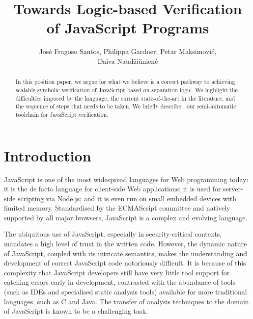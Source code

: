 \documentclass{llncs}
\newcounter{main}
\begin{document}
\title{Towards Logic-based Verification \\of JavaScript Programs}

\author{Jos\'{e} Fragoso Santos, Philippa Gardner, Petar Maksimovi\'{c}, \\[1mm]Daiva Naud\v{z}i\={u}nien\.{e}}


\maketitle

\begin{abstract}

In this position paper, we argue for what we believe is a correct pathway to achieving scalable symbolic verification of JavaScript based on separation logic. We highlight the difficulties imposed by the language, the current state-of-the-art in the literature, and the  sequence of steps that needs to be taken. We briefly describe \javert, our semi-automatic toolchain for JavaScript verification.

\end{abstract}

\section{Introduction}\label{intro}
JavaScript is one of the most widespread languages for Web programming
today:
 it is the de facto language for client-side Web
 applications; it is used for server-side scripting via 
 Node.js; and  it is even run on  small
 embedded devices with limited memory.  
Standardised by the ECMAScript committee and natively supported by all major browsers, JavaScript is a complex and evolving language. 

The ubiquitous use of JavaScript, especially in security-critical contexts, mandates a high level of trust in the written code.
However, the dynamic nature of JavaScript, coupled with its intricate semantics, makes the understanding and development of correct JavaScript code notoriously difficult. It is because of this complexity that JavaScript developers still have very little 
tool support for catching errors early in development, contrasted with  the abundance of tools (such as IDEs and specialised static analysis tools) available for more traditional languages, such as C and Java. 
The transfer of analysis techniques to the domain of JavaScript is known to be a challenging task.
\end{document}
